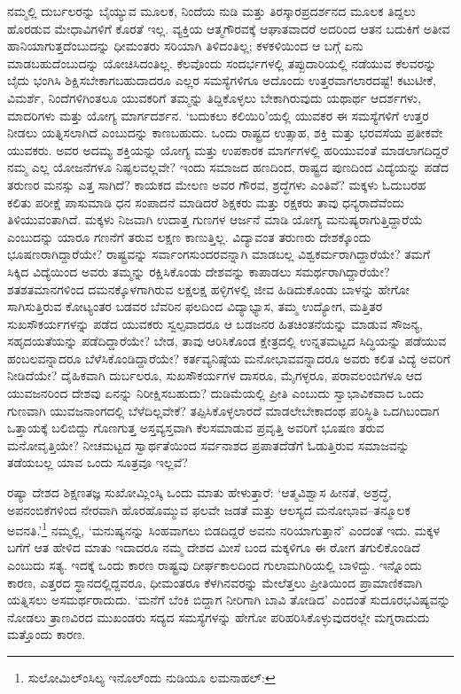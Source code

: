 ನಮ್ಮಲ್ಲಿ ದುರ್ಬಲರನ್ನು ಬೈಯ್ಯುವ ಮೂಲಕ, ನಿಂದೆಯ ನುಡಿ ಮತ್ತು ತಿರಸ್ಕಾರ\break ಪ್ರದರ್ಶನದ ಮೂಲಕ ತಿದ್ದಲು ಹೊರಡುವ ಮೇಧಾವಿಗಳಿಗೆ ಕೊರತೆ ಇಲ್ಲ. ವ್ಯಕ್ತಿಯ ಆತ್ಮಗೌರವಕ್ಕೆ ಆಘಾತವಾದರೆ ಅದರಿಂದ ಆತನ ಬದುಕಿಗೆ ಅತೀವ ಹಾನಿಯಾಗುತ್ತದೆಂಬುದನ್ನು ಧೀಮಂತರು ಸರಿಯಾಗಿ ತಿಳಿದಂತಿಲ್ಲ; ಕಳಕಳಿಯಿಂದ ಆ ಬಗ್ಗೆ ಏನು ಮಾಡಬಹುದೆಂಬುದನ್ನು ಯೋಚಿಸಿದಂತಿಲ್ಲ. ಕೆಲವೊಂದು ಸಂದರ್ಭಗಳಲ್ಲಿ ತಪ್ಪುದಾರಿಯಲ್ಲಿ ನಡೆಯುವ ಕೆಲವರನ್ನು ಬೈದು ಭಂಗಿಸಿ ಶಿಕ್ಷಿಸಬೇಕಾಗಬಹುದಾದರೂ ಎಲ್ಲರ ಸಮಸ್ಯೆಗಳಿಗೂ ಅದೊಂದು ಉತ್ತರವಾಗಲಾರದಷ್ಟೆ! ಕಟುಟೀಕೆ, ವಿಮರ್ಶೆ, ನಿಂದೆಗಳಿಗಿಂತಲೂ ಯುವಕರಿಗೆ ತಮ್ಮನ್ನು ತಿದ್ದಿಕೊಳ್ಳಲು ಬೇಕಾಗಿರುವುದು ಯಥಾರ್ಥ ಆದರ್ಶಗಳು, ಮಾದರಿಗಳು ಮತ್ತು ಯೋಗ್ಯ ಮಾರ್ಗದರ್ಶನ. ‘ಬದುಕಲು ಕಲಿಯಿರಿ’ಯಲ್ಲಿ ಯುವಕರ ಈ ಸಮಸ್ಯೆಗಳಿಗೆ ಉತ್ತರ ನೀಡಲು ಯತ್ನಿಸಲಾಗಿದೆ ಎಂಬುದನ್ನು ಕಾಣಬಹುದು. ಒಂದು ರಾಷ್ಟ್ರದ ಉತ್ಸಾಹ, ಶಕ್ತಿ ಮತ್ತು ಭರವಸೆಯ ಪ್ರತೀಕವೇ ಯುವಕರು. ಅವರ ಅದಮ್ಯ ಶಕ್ತಿಯನ್ನು ಯೋಗ್ಯ ಮತ್ತು ಉಪಕಾರಕ ಮಾರ್ಗಗಳಲ್ಲಿ ಹರಿಯುವಂತೆ ಮಾಡ\-ಲಾಗದಿದ್ದರೆ ನಮ್ಮ ಎಲ್ಲ ಯೋಜನೆಗಳೂ ನಿಷ್ಫಲವಲ್ಲವೇ? ಇಂದು ಸಮಾಜದ ಹಣದಿಂದ, ರಾಷ್ಟ್ರದ ಪುಣದಿಂದ ವಿದ್ಯೆಯನ್ನು ಪಡೆದ ತರುಣರ ಮನಸ್ಸು ಎತ್ತ ಸಾಗಿದೆ? ಕಾಯಕದ ಮೇಲಣ ಅವರ ಗೌರವ, ಶ್ರದ್ಧೆಗಳು ಎಂತಿವೆ? ಮಕ್ಕಳು ಓದುಬರಹ ಕಲಿತು ಪರೀಕ್ಷೆ ಪಾಸುಮಾಡಿ ಧನ ಸಂಪಾದನೆ ಮಾಡಿದರೆ ಶಿಕ್ಷಕರು ಮತ್ತು ರಕ್ಷಕರು ತಾವು ಧನ್ಯರಾದೆವೆಂದು ತಿಳಿಯುವಂತಾಗಿದೆ. ಮಕ್ಕಳು ನಿಜವಾಗಿ ಉದಾತ್ತ ಗುಣಗಳ ಆರ್ಜನೆ ಮಾಡಿ ಯೋಗ್ಯ ಮನುಷ್ಯರಾಗುತ್ತಿದ್ದಾರೆಯೆ ಎಂಬುದನ್ನು ಯಾರೂ ಗಣನೆಗೆ ತರುವ ಲಕ್ಷಣ ಕಾಣುತ್ತಿಲ್ಲ. ವಿದ್ಯಾವಂತ ತರುಣರು ದೇಶಕ್ಕೊಂದು ಭೂಷಣರಾಗಿದ್ದಾರೆಯೇ? ರಾಷ್ಟ್ರವನ್ನು ಸರ್ವಾಂಗಸುಂದರವನ್ನಾಗಿ ಮಾಡಬಲ್ಲ ವಿಶ್ವಕರ್ಮ\-ರಾಗಿದ್ದಾರೆಯೇ? ತಮಗೆ ಸಿಕ್ಕಿದ ವಿದ್ಯೆಯಿಂದ ಅವರು ತಮ್ಮನ್ನು ರಕ್ಷಿಸಿಕೊಂಡು ದೇಶವನ್ನು ಕಾಪಾಡಲು ಸಮರ್ಥ\-ರಾಗಿದ್ದಾರೆಯೇ? ಶತಶತಮಾನಗಳಿಂದ ದಮನಕ್ಕೊಳಗಾಗಿರುವ ಲಕ್ಷಲಕ್ಷ ಹಳ್ಳಿಗಳಲ್ಲಿ ಜೀವ ಹಿಡಿದುಕೊಂಡು ಬಾಳನ್ನು ಹೇಗೋ ಸಾಗಿಸುತ್ತಿರುವ ಕೋಟ್ಯಂತರ ಬಡವರ ಬೆವರಿನ ಫಲದಿಂದ ವಿದ್ಯಾಭ್ಯಾಸ, ತಮ್ಮ ಉದ್ಯೋಗ, ಮತ್ತಿತರ ಸುಖಸೌಕರ್ಯಗಳನ್ನು ಪಡೆದ ಯುವಕರು ಸ್ವಲ್ಪವಾದರೂ ಆ ಬಡಜನರ ಹಿತಚಿಂತನೆಯನ್ನು ಮಾಡುವ ಸೌಜನ್ಯ, ಸಹೃದಯತೆಯನ್ನು ಪಡೆದಿದ್ದಾರೆಯೇ? ಬೇಡ, ತಾವು ಆರಿಸಿಕೊಂಡ ಕ್ಷೇತ್ರದಲ್ಲಿ ಉನ್ನತಮಟ್ಟದ ಸಿದ್ಧಿಯನ್ನು ಪಡೆಯುವ ಹಂಬಲವನ್ನಾದರೂ ಬೆಳೆಸಿಕೊಂಡಿದ್ದಾರೆಯೇ? ಕರ್ತವ್ಯನಿಷ್ಠೆಯ ಮನೋಭಾವ\-ವನ್ನಾದರೂ ಅವರು ಕಲಿತ ವಿದ್ಯೆ ಅವರಿಗೆ ನೀಡಿದೆಯೇ? ದೈಹಿಕವಾಗಿ ದುರ್ಬಲರೂ, ಸುಖ\-ಸೌಕರ್ಯಗಳ ದಾಸರೂ, ಮೈಗಳ್ಳರೂ, ಪರಾವಲಂಬಿಗಳೂ ಆದ ಯುವಜನರಿಂದ ದೇಶವು ಏನನ್ನು ನಿರೀಕ್ಷಿಸಬಹುದು? ದುಡಿಮೆಯಲ್ಲಿ ಪ್ರೀತಿ ಎಂಬುದು ಸ್ವಾಭಾವಿಕವಾದ ಒಂದು ಗುಣವಾಗಿ ಯುವಜನಾಂಗದಲ್ಲಿ ಬೆಳೆದಿಲ್ಲವೇಕೆ? ತಪ್ಪಿಸಿಕೊಳ್ಳಲಾರದೆ ಮಾಡಲೇಬೇಕಾದಂಥ ಪರಿಸ್ಥಿತಿ ಒದಗಿಬಂದಾಗ ಒತ್ತಾಯಕ್ಕೆ ಬಲಿಬಿದ್ದು ಗೊಣಗುತ್ತ ಅಸ್ತವ್ಯಸ್ತವಾಗಿ ಕೆಲಸಮಾಡುವ ಪ್ರವೃತ್ತಿ ಅವರಿಗೆ ಭೂಷಣ ತರುವ ಮನೋವೃತ್ತಿಯೇ? ನೀಚಮಟ್ಟದ ಸ್ವಾರ್ಥತೆಯಿಂದ ಸರ್ವನಾಶದ ಪ್ರಪಾತದೆಡೆಗೆ ಓಡುತ್ತಿರುವ ಸಮಾಜವನ್ನು ತಡೆಯಬಲ್ಲ ಯಾವ ಒಂದು ಸೂತ್ರವೂ ಇಲ್ಲವೆ?

\newpage

ರಷ್ಯಾ ದೇಶದ ಶಿಕ್ಷಣತಜ್ಞ ಸುಖೋಮ್ಲಿಂಸ್ಕಿ ಒಂದು ಮಾತು ಹೇಳುತ್ತಾರೆ: ‘ಆತ್ಮವಿಶ್ವಾಸ ಹೀನತೆ, ಅಶ್ರದ್ಧೆ, ಅಪನಂಬಿಕೆಗಳಿಂದ ನೇರವಾಗಿ ಹೊರಹೊಮ್ಮುವ ಫಲವೇ ಜಡತೆ ಮತ್ತು ಆಲಸ್ಯದ ಮನೋಭಾವ–ತನ್ಮೂಲಕ ಅವನತಿ.’\footnote{ ಸುಲೋಮಿಲ್ಂಸಿಲ್ಯ ಇನೊಲ್ಂದು ನುಡಿಯೂ ಲಮನಾಹಲ್:

} ನಮ್ಮಲ್ಲಿ, ‘ಮನುಷ್ಯನನ್ನು ಸಿಂಹವಾಗಲು ಬಿಡದಿದ್ದರೆ ಅವನು ನರಿಯಾಗುತ್ತಾನೆ’ ಎಂದಂತೆ ಇದು. ಮಕ್ಕಳ ಬಗೆಗೆ ಆತ ಹೇಳಿದ ಮಾತು ಇದಾದರೂ ನಮ್ಮ ದೇಶದ ಮೀಸೆ ಬಂದ ಮಕ್ಕಳಿಗೂ ಈ ರೋಗ ತಗುಲಿಕೊಂಡಿದೆ ಎಂಬುದು ಸತ್ಯ. ಇದಕ್ಕೆ ಒಂದು ಕಾರಣ ರಾಷ್ಟ್ರವು ದೀರ್ಘಕಾಲದಿಂದ ಗುಲಾಮಗಿರಿಯಲ್ಲಿ ಬಾಳಿದ್ದು. ಇನ್ನೊಂದು ಕಾರಣ, ಎತ್ತರದ ಸ್ಥಾನದಲ್ಲಿದ್ದವರೂ, ಧೀಮಂತರೂ ಕೆಳಗಿನವರನ್ನು ಮೇಲೆತ್ತಲು ಪ್ರೀತಿಯಿಂದ ಪ್ರಾಮಾಣಿಕವಾಗಿ ಯತ್ನಿಸಲು ಅಸಮರ್ಥರಾದುದು. ‘ಮನೆಗೆ ಬೆಂಕಿ ಬಿದ್ದಾಗ ನೀರಿಗಾಗಿ ಬಾವಿ ತೋಡಿದ’ ಎಂದಂತೆ ಸುದೂರಭವಿಷ್ಯವನ್ನು ನೋಡಲು ತ್ರಾಣವಿರದ ಮುಖಂಡರು ಸದ್ಯದ ಸಮಸ್ಯೆಗಳನ್ನು ಹೇಗೋ ಪರಿಹರಿಸಿಕೊಳ್ಳುವುದರಲ್ಲೇ ಮಗ್ನರಾದುದು ಮತ್ತೊಂದು ಕಾರಣ.

